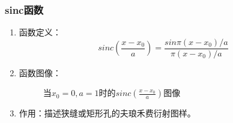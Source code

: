\documentclass[twocolumn]{ctexart}
\begin{document}
\subsubsection{sinc函数}
\begin{enumerate}
    \item
          函数定义：
          \begin{equation}
              sinc\left(\frac{x-x_0}{a}\right)=\frac{sin\pi\left(x-x_0\right)/a}{\pi\left(x-x_0\right)/a}
              \nonumber
          \end{equation}
    \item
          函数图像：
          \begin{figure}[H]
              \caption{当$x_0=0,a=1$时的$sinc\left(\frac{x-x_0}{a}\right)$图像}
          \end{figure}
    \item
          作用：描述狭缝或矩形孔的夫琅禾费衍射图样。
\end{enumerate}
\end{document}
